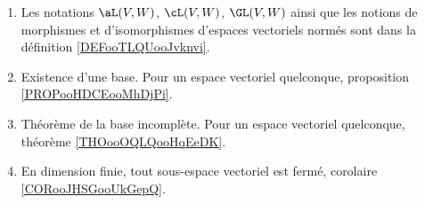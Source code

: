 
\begin{enumerate}
	\item
	      Les notations \( \aL(V,W)\), \( \cL(V,W)\), \( \GL(V,W)\) ainsi que les notions de morphismes et d'isomorphismes d'espaces vectoriels normés sont dans la définition \ref{DEFooTLQUooJvknvi}.
	\item
	      Existence d'une base. Pour un espace vectoriel quelconque, proposition \ref{PROPooHDCEooMhDjPi}.
	\item
	      Théorème de la base incomplète. Pour un espace vectoriel quelconque, théorème \ref{THOooOQLQooHqEeDK}.
	\item
	      En dimension finie, tout sous-espace vectoriel est fermé, corolaire \ref{CORooJHSGooUkGepQ}.
\end{enumerate}

